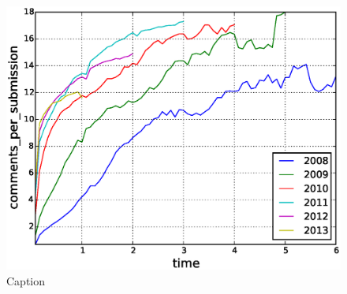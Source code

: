 \begin{figure}[!tb]
\centering
\includegraphics[scale=0.4]{./images/comments_per_submissions_cohorts.eps}
\caption{Caption}
\label{fig:comments_per_submissions_cohorts}
\end{figure}

